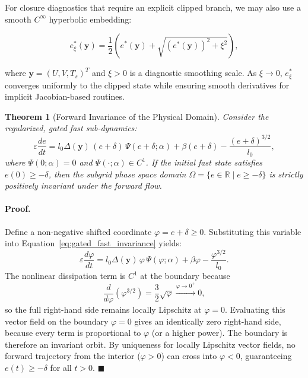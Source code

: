 \documentclass[11pt,letterpaper]{article}
\newtheorem{theorem}{Theorem}
\begin{document}
For closure diagnostics that require an explicit clipped branch, we may also use a smooth $C^{\infty}$ hyperbolic embedding:

\begin{equation}
e^*_{\xi}(\mathbf{y}) = \frac{1}{2}\left(e^*(\mathbf{y}) + \sqrt{(e^*(\mathbf{y}))^2 + \xi^2}\right),
\label{eq:hyperbolic_embedding_unified}
\end{equation}

where $\mathbf{y} = (U, V, T_s)^T$ and $\xi > 0$ is a diagnostic smoothing scale. As $\xi \to 0$, $e^*_{\xi}$ converges uniformly to the clipped state while ensuring smooth derivatives for implicit Jacobian-based routines.

\begin{theorem}[Forward Invariance of the Physical Domain]
\label{thm:forward_invariance}
Consider the regularized, gated fast sub-dynamics:
\begin{equation}
\varepsilon\frac{de}{dt}=l_0\Delta(\mathbf{y})\,(e+\delta)\,\Psi(e+\delta;\alpha)+\beta(e+\delta)-\frac{(e+\delta)^{3/2}}{l_0},
\label{eq:gated_fast_invariance}
\end{equation}
where $\Psi(0;\alpha)=0$ and $\Psi(\cdot;\alpha)\in C^1$. If the initial fast state satisfies $e(0) \ge -\delta$, then the subgrid phase space domain $\Omega = \{e \in \mathbb{R} \mid e \ge -\delta\}$ is strictly positively invariant under the forward flow.
\end{theorem}

\paragraph{Proof.}
Define a non-negative shifted coordinate $\varphi = e + \delta \ge 0$. Substituting this variable into Equation~\eqref{eq:gated_fast_invariance} yields:
\begin{equation}
\varepsilon\frac{d\varphi}{dt}=l_0\Delta(\mathbf{y})\,\varphi\,\Psi(\varphi;\alpha)+\beta\varphi-\frac{\varphi^{3/2}}{l_0}.
\end{equation}
The nonlinear dissipation term is $C^1$ at the boundary because
\begin{equation}
\frac{d}{d\varphi}\left(\varphi^{3/2}\right)=\frac{3}{2}\sqrt{\varphi}\xrightarrow{\varphi\to 0^+}0,
\end{equation}
so the full right-hand side remains locally Lipschitz at $\varphi=0$.
Evaluating this vector field on the boundary $\varphi=0$ gives an identically zero right-hand side, because every term is proportional to $\varphi$ (or a higher power). The boundary is therefore an invariant orbit. By uniqueness for locally Lipschitz vector fields, no forward trajectory from the interior ($\varphi>0$) can cross into $\varphi<0$, guaranteeing $e(t)\ge -\delta$ for all $t>0$. $\blacksquare$
\end{document}
